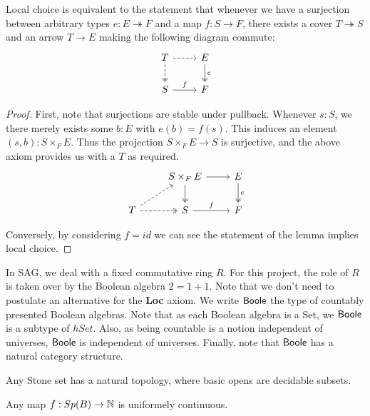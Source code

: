 \begin{lemma}
  Local choice is equivalent to the statement that whenever 
  we have a surjection  between arbitrary types $e:E \twoheadrightarrow F$  and  
  a map $f:S\to F$, there exists a cover $T\twoheadrightarrow S$ and an arrow $T\to E$ making the following diagram commute:
    \begin{equation}\begin{tikzcd}
      T \arrow[d,dashed, two heads ] \arrow[r,dashed]&  E \arrow[d,""',two heads, "e"]\\
      S  \arrow[r, "f"] & F
    \end{tikzcd}\end{equation}  
\end{lemma}
\begin{proof}
  First, note that surjections are stable under pullback.
  Whenever $s:S$, we there merely exists some $b:E$ with $e(b) = f(s)$. 
  This induces an element $(s,b):S\times_F E$. 
  Thus the projection $S\times_F E \to S$ is surjective, and 
  the above axiom provides us with a $T$ as required. 
    \begin{equation}\begin{tikzcd}
     & S \times_F E \arrow[r] \arrow[d,two heads] &  E \arrow[d,""',two heads, "e"]\\
       T \arrow[r, two heads ,dashed ] \arrow[ru,dashed]& 
       S  \arrow[r, "f"] & F
    \end{tikzcd}\end{equation}  
    
    Conversely, by considering $f=id$ we can see the statement of the lemma implies local choice. 
\end{proof}



In SAG, we deal with a fixed commutative ring $R$. For this project, the role of $R$ is taken over by 
the Boolean algebra $2 = 1+1$. Note that we don't need to postulate an alternative for the \textbf{Loc} axiom. 
We write $\mathsf{Boole}$ the type of countably presented Boolean algebras.
Note that as each Boolean algebra is a Set, we $\mathsf{Boole}$ is a subtype of $hSet$.
Also, as being countable is a notion independent of universes, $\mathsf{Boole}$ is independent of universes.
Finally, note that $\mathsf{Boole}$ has a natural category structure. 

Any Stone set has a natural topology, where basic opens are decidable subsets.

\medskip

\begin{proposition}
Any map $f: Sp(B)\rightarrow\mathbb{N}$ is uniformely continuous.
\end{proposition}  

